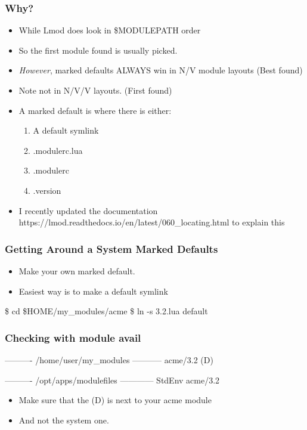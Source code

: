 \documentclass{beamer}
\begin{document}
\begin{frame}[fragile]
    \frametitle{Why?}
  \begin{itemize}
    \item While Lmod does look in \$MODULEPATH order
    \item So the first module found is usually picked.
    \item {\color{red}\emph{However}}, marked defaults ALWAYS win in
      N/V module layouts (Best found)
    \item Note not in N/V/V layouts. (First found)
    \item A marked default is where there is either:
      \begin{enumerate}
        \item A default symlink
        \item .modulerc.lua
        \item .modulerc
        \item .version
      \end{enumerate}
    \item I recently updated the documentation
      https://lmod.readthedocs.io/en/latest/060\_locating.html
      to explain this
  \end{itemize}
\end{frame}

\begin{frame}[fragile]
    \frametitle{Getting Around a System Marked Defaults}
  \begin{itemize}
    \item Make your own marked default.
    \item Easiest way is to make a default symlink
  \end{itemize}
 {\tiny
    \begin{semiverbatim}
        \$ cd \$HOME/my\_modules/acme
        \$ ln -s 3.2.lua default
    \end{semiverbatim}
}
\end{frame}



\begin{frame}[fragile]
    \frametitle{Checking with module avail}
 {\tiny
    \begin{semiverbatim}
   ---------- /home/user/my\_modules -----------
   acme/3.2 (D) 
 
   ---------- /opt/apps/modulefiles ------------
   StdEnv    acme/3.2

    \end{semiverbatim}
}
  \begin{itemize}
    \item Make sure that the (D) is next to your acme module 
    \item And not the system one.
  \end{itemize}
\end{frame}
\end{document}
